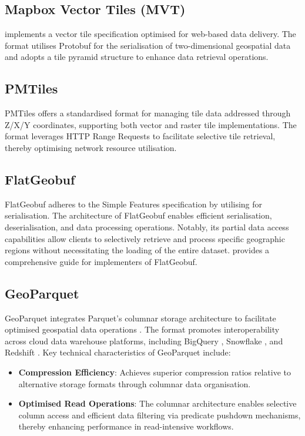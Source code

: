 \subsection{Mapbox Vector Tiles (MVT)}
\label{rw:cloud_optimised_implementations:mvt}
\citet{mapbox-vector-tiles} implements a vector tile specification optimised for web-based data delivery. The format utilises Protobuf for the serialisation of two-dimensional geospatial data and adopts a tile pyramid structure to enhance data retrieval operations.

\subsection{PMTiles}
\label{rw:cloud_optimised_implementations:pmtiles}
PMTiles offers a standardised format for managing tile data addressed through Z/X/Y coordinates, supporting both vector and raster tile implementations. The format leverages HTTP Range Requests \citep{http_range_requests} to facilitate selective tile retrieval, thereby optimising network resource utilisation.

\subsection{FlatGeobuf}
\label{rw:cloud_optimised_implementations:flatgeobuf}
FlatGeobuf adheres to the Simple Features \citet{simple_features} specification by utilising \citet{flatbuffers} for serialisation. The architecture of FlatGeobuf enables efficient serialisation, deserialisation, and data processing operations. Notably, its partial data access capabilities allow clients to selectively retrieve and process specific geographic regions without necessitating the loading of the entire dataset. \citet{horance_2022_detail} provides a comprehensive guide for implementers of FlatGeobuf.

\subsection{GeoParquet}
\label{rw:cloud_optimised_implementations:geoparquet}
GeoParquet integrates Parquet's columnar storage architecture to facilitate optimised geospatial data operations \citep{geoparquet}. The format promotes interoperability across cloud data warehouse platforms, including BigQuery \citep{bigquery}, Snowflake \citep{snowflake}, and Redshift \citep{redshift}. Key technical characteristics of GeoParquet include:

\begin{itemize}
  \item \textbf{Compression Efficiency}: Achieves superior compression ratios relative to alternative storage formats through columnar data organisation.
  \item \textbf{Optimised Read Operations}: The columnar architecture enables selective column access and efficient data filtering via predicate pushdown mechanisms, thereby enhancing performance in read-intensive workflows.
\end{itemize}

